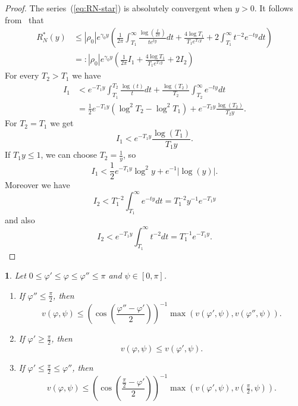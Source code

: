 \documentclass[oneside,english]{amsart}
\numberwithin{equation}{section}
\numberwithin{figure}{section}
\theoremstyle{plain}
\theoremstyle{plain}
\theoremstyle{plain}
\newtheorem{lem}{\protect\lemmaname}
\theoremstyle{definition}
\providecommand{\lemmaname}{Lemma}
\begin{document}
\begin{proof}
The series~(\ref{eq:RN-star}) is absolutely convergent when $y>0$.
It follows from~\cite[Lemma 1]{Lehman1966} that
\begin{align*}
R_{N}^{*}(y) & \leq\left|\rho_{0}\right|e^{\gamma_{0}y}\left(\frac{1}{2\pi}\int_{T_{1}}^{\infty}\frac{\log\left(\frac{t}{2\pi}\right)}{te^{ty}}dt+\frac{4\log T_{1}}{T_{1}e^{T_{1}y}}+2\int_{T_{1}}^{\infty}t^{-2}e^{-ty}dt\right)\\
 & =:\left|\rho_{0}\right|e^{\gamma_{0}y}\left(\frac{1}{2\pi}I_{1}+\frac{4\log T_{1}}{T_{1}e^{T_{1}y}}+2I_{2}\right)
\end{align*}
For every $T_{2}>T_{1}$ we have 
\begin{align*}
I_{1} & <e^{-T_{1}y}\int_{T_{1}}^{T_{2}}\frac{\log\left(t\right)}{t}dt+\frac{\log\left(T_{2}\right)}{T_{2}}\int_{T_{2}}^{\infty}e^{-ty}dt\\
 & =\frac{1}{2}e^{-T_{1}y}\left(\log^{2}T_{2}-\log^{2}T_{1}\right)+e^{-T_{2}y}\frac{\log\left(T_{2}\right)}{T_{2}y}.
\end{align*}
For $T_{2}=T_{1}$ we get
\[
I_{1}<e^{-T_{1}y}\frac{\log\left(T_{1}\right)}{T_{1}y}.
\]
If $T_{1}y\leq1$, we can choose $T_{2}=\frac{1}{y}$, so
\[
I_{1}<\frac{1}{2}e^{-T_{1}y}\log^{2}y+e^{-1}\left|\log\left(y\right)\right|.
\]
Moreover we have
\[
I_{2}<T_{1}^{-2}\int_{T_{1}}^{\infty}e^{-ty}dt=T_{1}^{-2}y^{-1}e^{-T_{1}y}
\]
and also
\[
I_{2}<e^{-T_{1}y}\int_{T_{1}}^{\infty}t^{-2}dt=T_{1}^{-1}e^{-T_{1}y}.
\]
\end{proof}
\begin{lem}
\label{lem:v-extremes}Let $0\leq\varphi'\leq\varphi\leq\varphi''\leq\pi$
and $\psi\in[0,\pi]$.
\begin{enumerate}
\item [$(i)$] If $\varphi''\leq\frac{\pi}{2}$, then
\[
v(\varphi,\psi)\leq\left(\cos\left(\frac{\varphi''-\varphi'}{2}\right)\right)^{-1}\max\left(v(\varphi',\psi),v(\varphi'',\psi)\right).
\]
\item [$(ii)$] If $\varphi'\geq\frac{\pi}{2}$, then
\[
v(\varphi,\psi)\leq v(\varphi',\psi).
\]
\item [$(iii)$] If $\varphi'\leq\frac{\pi}{2}\leq\varphi''$, then
\[
v(\varphi,\psi)\leq\left(\cos\left(\frac{\frac{\pi}{2}-\varphi'}{2}\right)\right)^{-1}\max\left(v(\varphi',\psi),v(\tfrac{\pi}{2},\psi)\right).
\]
\end{enumerate}
\end{lem}
\end{document}
